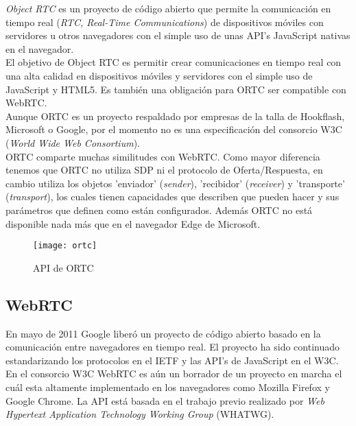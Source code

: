\emph{Object RTC} es un proyecto de código abierto que permite la comunicación en tiempo real (\emph{RTC, Real-Time Communications}) de dispositivos móviles con servidores u otros navegadores con el simple uso de unas API's JavaScript nativas en el navegador.\\ 

El objetivo de Object RTC es permitir crear comunicaciones en tiempo real con una alta calidad en dispositivos móviles y servidores con el simple uso de JavaScript y HTML5. Es también una obligación para ORTC ser compatible con WebRTC.\\

Aunque ORTC es un proyecto respaldado por empresas de la talla de Hookflash, Microsoft o Google, por el momento no es una especificación del consorcio W3C (\emph{World Wide Web Consortium}).\\

ORTC comparte muchas similitudes con WebRTC. Como mayor diferencia tenemos que ORTC no utiliza SDP ni el protocolo de Oferta/Respuesta, en cambio utiliza los objetos 'enviador' (\emph{sender}), 'recibidor' (\emph{receiver}) y 'transporte' (\emph{transport}), los cuales tienen capacidades que describen que pueden hacer y sus parámetros que definen como están configurados. Además ORTC no está disponible nada más que en el navegador Edge de Microsoft.\\

\begin{figure}[htb]
\centering
\texttt{[image: ortc]}
\caption{API de ORTC}
\label{fig:ortc}
\end{figure}


\subsection{WebRTC}

En mayo de 2011 Google liberó un proyecto de código abierto basado en la comunicación entre navegadores en tiempo real. El proyecto ha sido continuado estandarizando los protocolos en el IETF y las API's de JavaScript en el W3C.\\

En el consorcio W3C WebRTC es aún un borrador de un proyecto en marcha el cuál esta altamente implementado en los navegadores como Mozilla Firefox y Google Chrome. La API está basada en el trabajo previo realizado por \emph{Web Hypertext Application Technology Working Group} (WHATWG).\\

